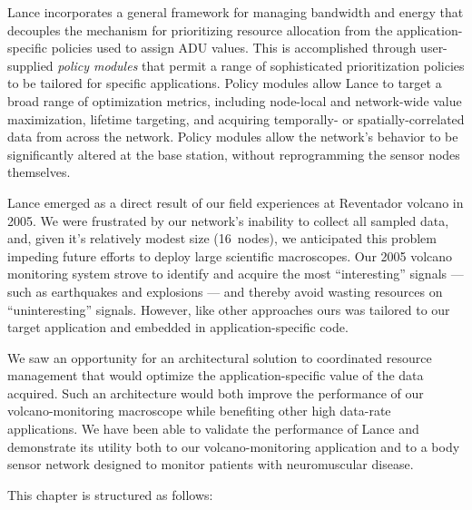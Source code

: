 Lance incorporates a general framework for managing bandwidth and energy that
decouples the mechanism for prioritizing resource allocation from the
application-specific policies used to assign ADU values. This is accomplished
through user-supplied \textit{policy modules} that permit a range of
sophisticated prioritization policies to be tailored for specific
applications. Policy modules allow Lance to target a broad range of
optimization metrics, including node-local and network-wide value
maximization, lifetime targeting, and acquiring temporally- or
spatially-correlated data from across the network. Policy modules allow the
network's behavior to be significantly altered at the base station, without
reprogramming the sensor nodes themselves.

Lance emerged as a direct result of our field experiences at Reventador
volcano in 2005. We were frustrated by our network's inability to collect all
sampled data, and, given it's relatively modest size (16~nodes), we
anticipated this problem impeding future efforts to deploy large scientific
macroscopes. Our 2005 volcano monitoring system strove to identify and
acquire the most ``interesting'' signals --- such as earthquakes and
explosions --- and thereby avoid wasting resources on ``uninteresting''
signals. However, like other approaches ours was tailored to our target
application and embedded in application-specific code.

We saw an opportunity for an architectural solution to coordinated resource
management that would optimize the application-specific value of the data
acquired. Such an architecture would both improve the performance of our
volcano-monitoring macroscope while benefiting other high data-rate
applications. We have been able to validate the performance of Lance and
demonstrate its utility both to our volcano-monitoring application and to a
body sensor network designed to monitor patients with neuromuscular disease.

This chapter is structured as follows:

